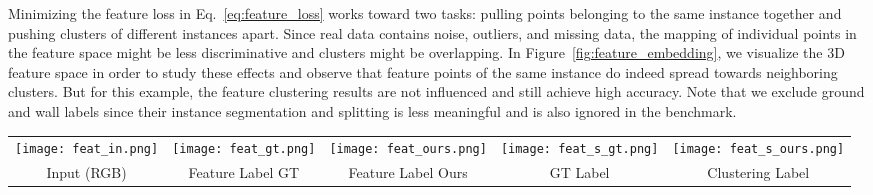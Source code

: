 \documentclass[10pt,twocolumn,letterpaper]{article}
\newcommand{\boldparagraph}[1]{\vspace{0.5em}\noindent{\bf #1} }
\begin{document}
\boldparagraph{Feature Space Study.}
Minimizing the feature loss in Eq.~\eqref{eq:feature_loss} works toward two tasks: pulling points belonging to the same instance together and pushing clusters of different instances apart. Since real data contains noise, outliers, and missing data, the mapping of individual points in the feature space might be less discriminative and clusters might be overlapping.
In Figure~\ref{fig:feature_embedding}, we visualize the 3D feature space in order to study these effects and observe that feature points of the same instance do indeed spread towards neighboring clusters. But for this example, the feature clustering results are not influenced and still achieve high accuracy. Note that we exclude ground and wall labels since their instance segmentation and splitting is less meaningful and is also ignored in the benchmark.
\begin{figure*}[ht!]
  \small
\centering
  \vspace{-0.2cm}
\newcommand{\sz}{0.36}
  \begin{tabular}{ccccc}
\texttt{[image: feat\_in.png]} &     
    \texttt{[image: feat\_gt.png]} &
    \texttt{[image: feat\_ours.png]} &     
    \texttt{[image: feat\_s\_gt.png]} &  
    \texttt{[image: feat\_s\_ours.png]} \\
Input (RGB) & Feature Label GT & Feature Label Ours & GT Label & Clustering Label \\
\end{tabular}
  \vspace{0.1cm}
  \caption{\textbf{Visualization of the feature embedding and labeling.} This figure shows (from left to right) the colored 3D scene input, its generated 3D feature embeddings, along with the ground truth (GT) labels and our instance labeling result after mean-shift clustering (colors of the instances in the final results are chosen randomly and do not correspond to GT label colors).}
  \vspace{-0.1cm}
  \label{fig:feature_embedding}
\end{figure*}
\end{document}

